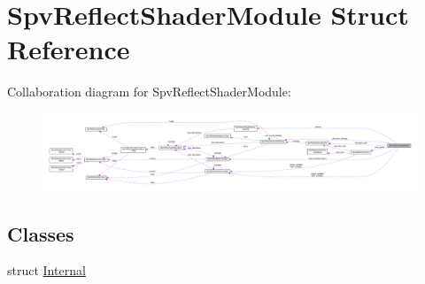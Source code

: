 \hypertarget{structSpvReflectShaderModule}{}\section{Spv\+Reflect\+Shader\+Module Struct Reference}
\label{structSpvReflectShaderModule}


Collaboration diagram for Spv\+Reflect\+Shader\+Module\+:\nopagebreak
\begin{figure}[H]
\begin{center}
\leavevmode
\includegraphics[width=350pt]{structSpvReflectShaderModule__coll__graph}
\end{center}
\end{figure}
\subsection*{Classes}
\begin{DoxyCompactItemize}
\item 
struct \hyperlink{structSpvReflectShaderModule_1_1Internal}{Internal}
\end{DoxyCompactItemize}
